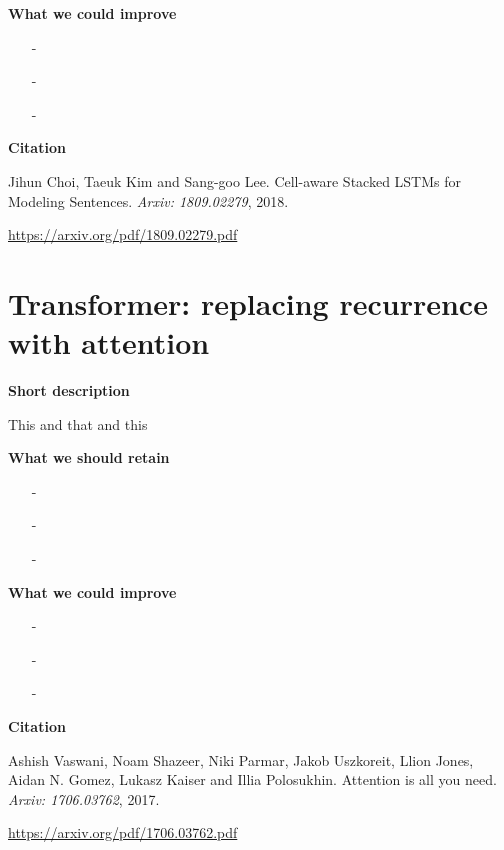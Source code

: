 \textbf{What we could improve}

\begin{enumerate}[topsep = 0pt, itemsep = 0pt]
    \item[-] 
    
    \item[-] 
    
    \item[-]
    
\end{enumerate}


\textbf{Citation}

Jihun Choi, Taeuk Kim and Sang-goo Lee.
Cell-aware Stacked LSTMs for Modeling Sentences.
\textit{Arxiv: 1809.02279}, 2018.


\url{https://arxiv.org/pdf/1809.02279.pdf}



\newpage
\section{Transformer: replacing recurrence with attention}


\textbf{Short description}

This and that and this


\textbf{What we should retain}

\begin{enumerate}[topsep = 0pt, itemsep = 0pt]
    \item[-] 
    
    \item[-] 
    
    \item[-]
    
\end{enumerate}


\textbf{What we could improve}

\begin{enumerate}[topsep = 0pt, itemsep = 0pt]
    \item[-] 
    
    \item[-] 
    
    \item[-]
    
\end{enumerate}


\textbf{Citation}

Ashish Vaswani, Noam Shazeer, Niki Parmar, Jakob Uszkoreit, Llion Jones, Aidan N. Gomez, Lukasz Kaiser and Illia Polosukhin.
Attention is all you need.
\textit{Arxiv: 1706.03762}, 2017.


\url{https://arxiv.org/pdf/1706.03762.pdf}

